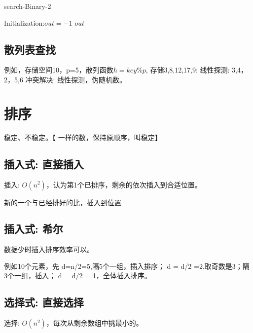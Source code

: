 \documentclass[UTF8]{../computerUniverse}
\begin{document}
      \begin{algorithm}[h]%
        \caption{search-Binary-2}\label{algo:search_Binary_2}
        \SetAlgoLined
        Initialization:$out = -1$\;
        \KwRet $out$\;
      \end{algorithm}



\subsection{散列表查找}
例如，存储空间10，p=5，散列函数$h=key\%p$,
存储3,8,12,17,9: 线性探测:  3,4，2，5,6
冲突解决: 线性探测，伪随机数。



\section{排序}

稳定、不稳定。【 一样的数，保持原顺序，叫稳定】



\subsection{插入式: 直接插入}
插入: $O(n^2)$，认为第1个已排序，剩余的依次插入到合适位置。

新的一个与已经排好的比，插入到位置


\subsection{插入式: 希尔}
数据少时插入排序效率可以。

例如10个元素，先
d=n/2=5,隔5个一组，插入排序；
d = d/2  =2,取奇数是3；隔3个一组，插入；
d = d/2 = 1，全体插入排序。


\subsection{选择式: 直接选择}
选择: $O(n^2)$，每次从剩余数组中挑最小的。
\end{document}
